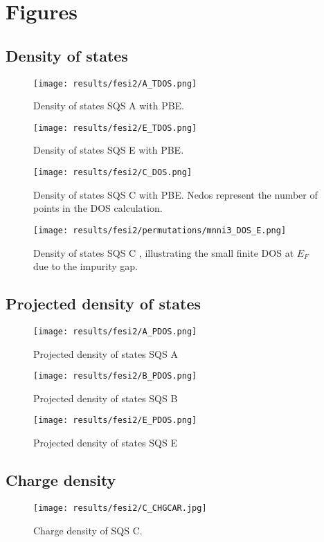 \chapter{Figures}
\label{appendix:equi}

\section{Density of states}

\begin{figure}[H]
	\centering
	\texttt{[image: results/fesi2/A\_TDOS.png]}
	\caption{Density of states SQS A  with PBE.}
\end{figure}

\begin{figure}[H]
	\centering
	\texttt{[image: results/fesi2/E\_TDOS.png]}
	\caption{Density of states SQS E  with PBE.}
\end{figure}

\begin{figure}[H]
	\centering
	\texttt{[image: results/fesi2/C\_DOS.png]}
	\caption{Density of states SQS C  with PBE. Nedos represent the number of points in the DOS calculation.}
\end{figure}

\begin{figure}[H]
\texttt{[image: results/fesi2/permutations/mnni3\_DOS\_E.png]}
\caption{Density of states SQS C , illustrating the small finite DOS at $E_F$ due to the impurity gap.}
\end{figure}

\section{Projected density of states}

\begin{figure}[H]
\texttt{[image: results/fesi2/A\_PDOS.png]}
\caption{Projected density of states SQS A}
\end{figure}

\begin{figure}[H]
\texttt{[image: results/fesi2/B\_PDOS.png]}
\caption{Projected density of states SQS B}
\end{figure}

\begin{figure}[H]
\texttt{[image: results/fesi2/E\_PDOS.png]}
\caption{Projected density of states SQS E}
\end{figure}

\section{Charge density}

\begin{figure}[H]
\texttt{[image: results/fesi2/C\_CHGCAR.jpg]}
\caption{Charge density of SQS C.}
\end{figure}

